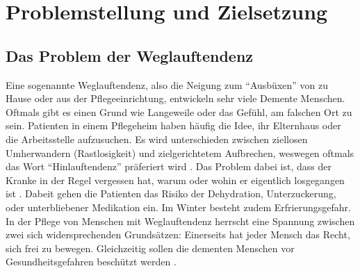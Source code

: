 \section{Problemstellung und Zielsetzung}\label{sec:definitionen}
\subsection{Das Problem der Weglauftendenz}
Eine sogenannte Weglauftendenz, also die Neigung zum \enquote{Ausbüxen} von zu Hause oder aus der Pflegeeinrichtung, entwickeln sehr viele Demente Menschen. Oftmals gibt es einen Grund wie Langeweile oder das Gefühl, am falschen Ort zu sein. Patienten in einem Pflegeheim haben häufig die Idee, ihr Elternhaus oder die Arbeitsstelle aufzusuchen. Es wird unterschieden zwischen ziellosen Umherwandern (Rastlosigkeit) und zielgerichtetem Aufbrechen, weswegen oftmals das Wort \enquote{Hinlauftendenz} präferiert wird \citep[Vgl.][]{hinlauf}. Das Problem dabei ist, dass der Kranke in der Regel vergessen hat, warum oder wohin er eigentlich losgegangen ist \citep[Vgl.][]{dgk}. Dabeit gehen die Patienten das Risiko der Dehydration, Unterzuckerung, oder unterbliebener Medikation ein. Im Winter besteht zudem Erfrierungsgefahr. In der Pflege von Menschen mit Weglauftendenz herrscht eine Spannung zwischen zwei sich widersprechenden Grundsätzen: Einerseits hat jeder Mensch das Recht, sich frei zu bewegen. Gleichzeitig sollen die dementen Menschen vor Gesundheitsgefahren beschützt werden \citep[Vgl.][]{pqsg}.
